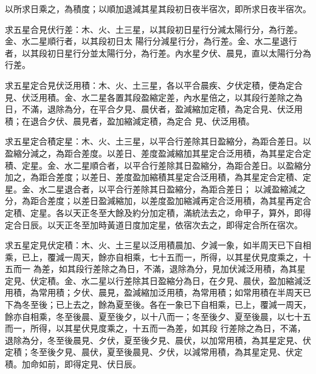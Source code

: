 \begin{pinyinscope}
 以所求日乘之，為積度；以順加退減其星其段初日夜半宿次，即所求日夜半宿次。



 求五星合見伏行差：木、火、土三星，以其段初日星行分減太陽行分，為行差。金、水二星順行者，以其段初日太
 陽行分減星行分，為行差。金、水二星退行者，以其段初日星行分並太陽行分，為行差。內水星夕伏、晨見，直以太陽行分為行差。



 求五星定合見伏泛用積：木、火、土三星，各以平合晨疾、夕伏定積，便為定合見、伏泛用積。金、水二星各置其段盈縮定差，內水星倍之，以其段行差除之為日，不滿，退除為分，在平合夕見、晨伏者，盈減縮加定積，為定合見、伏泛用積；在退合夕伏、晨見者，盈加縮減定積，為定合
 見、伏泛用積。



 求五星定合積定星：木、火、土三星，以平合行差除其日盈縮分，為距合差日。以盈縮分減之，為距合差度。以差日、差度盈減縮加其星定合泛用積，為其星定合定積、定星。金、水二星順合者，以平合行差除其日盈縮分，為距合差日。以盈縮分加之，為距合差度；以差日、差度盈加縮積其星定合泛用積，為其星定合定積、定星。金、水二星退合者，以平合行差除其日盈縮分，為距合差日；
 以減盈縮減之分，為距合差度；以差日盈減縮加，以差度盈加縮減再定合泛用積，為其星再定合定積、定星。各以天正冬至大餘及約分加定積，滿統法去之，命甲子，算外，即得定合日辰。以天正冬至加時黃道日度加定星，依宿次去之，即得定合所在宿次。



 求五星定見伏定積：木、火、土三星以泛用積晨加、夕減一象，如半周天已下自相乘，已上，覆減一周天，餘亦自相乘，七十五而一，所得，以其星伏見度乘之，十五而一
 為差，如其段行差除之為日，不滿，退除為分，見加伏減泛用積，為其星定見、伏定積。金、水二星以行差除其日盈縮分為日，在夕見、晨伏，盈加縮減泛用積，為常用積；夕伏、晨見，盈減縮加泛用積，為常用積；如常用積在半周天已下為冬至後；已上去之，餘為夏至後。各在一象已下自相乘，已上，覆減一周天，餘亦自相乘，冬至後晨、夏至後夕，以十八而一；冬至後夕、夏至後晨，以七十五而一，所得，以其星伏見度乘之，十五而一為差，如其段
 行差除之為日，不滿，退除為分，冬至後晨見、夕伏，夏至後夕見、晨伏，以加常用積，為其星定見、伏定積；冬至後夕見、晨伏，夏至後晨見、夕伏，以減常用積，為其星定見、伏定積。加命如前，即得定見、伏日辰。



\end{pinyinscope}